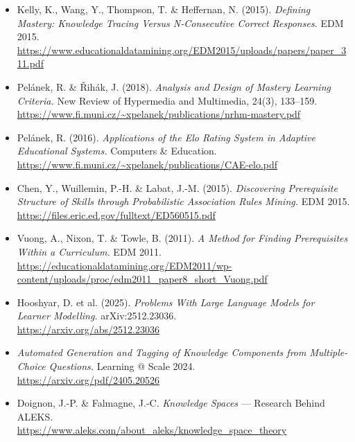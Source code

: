 \documentclass[11pt,a4paper]{article}
\begin{document}
\begin{itemize}[leftmargin=1.2em]
\item Kelly, K., Wang, Y., Thompson, T. \& Heffernan, N. (2015). \emph{Defining Mastery: Knowledge Tracing Versus N-Consecutive Correct Responses.} EDM 2015.\\
{\footnotesize\url{https://www.educationaldatamining.org/EDM2015/uploads/papers/paper_311.pdf}}

\item Pelánek, R. \& Řihák, J. (2018). \emph{Analysis and Design of Mastery Learning Criteria.} New Review of Hypermedia and Multimedia, 24(3), 133--159.\\
{\footnotesize\url{https://www.fi.muni.cz/~xpelanek/publications/nrhm-mastery.pdf}}

\item Pelánek, R. (2016). \emph{Applications of the Elo Rating System in Adaptive Educational Systems.} Computers \& Education.\\
{\footnotesize\url{https://www.fi.muni.cz/~xpelanek/publications/CAE-elo.pdf}}

\item Chen, Y., Wuillemin, P.-H. \& Labat, J.-M. (2015). \emph{Discovering Prerequisite Structure of Skills through Probabilistic Association Rules Mining.} EDM 2015.\\
{\footnotesize\url{https://files.eric.ed.gov/fulltext/ED560515.pdf}}

\item Vuong, A., Nixon, T. \& Towle, B. (2011). \emph{A Method for Finding Prerequisites Within a Curriculum.} EDM 2011.\\
{\footnotesize\url{https://educationaldatamining.org/EDM2011/wp-content/uploads/proc/edm2011_paper8_short_Vuong.pdf}}

\item Hooshyar, D. et al. (2025). \emph{Problems With Large Language Models for Learner Modelling.} arXiv:2512.23036.\\
{\footnotesize\url{https://arxiv.org/abs/2512.23036}}

\item \emph{Automated Generation and Tagging of Knowledge Components from Multiple-Choice Questions.} Learning @ Scale 2024.\\
{\footnotesize\url{https://arxiv.org/pdf/2405.20526}}

\item Doignon, J.-P. \& Falmagne, J.-C. \emph{Knowledge Spaces} --- Research Behind ALEKS.\\
{\footnotesize\url{https://www.aleks.com/about_aleks/knowledge_space_theory}}


\end{itemize}
\end{document}
